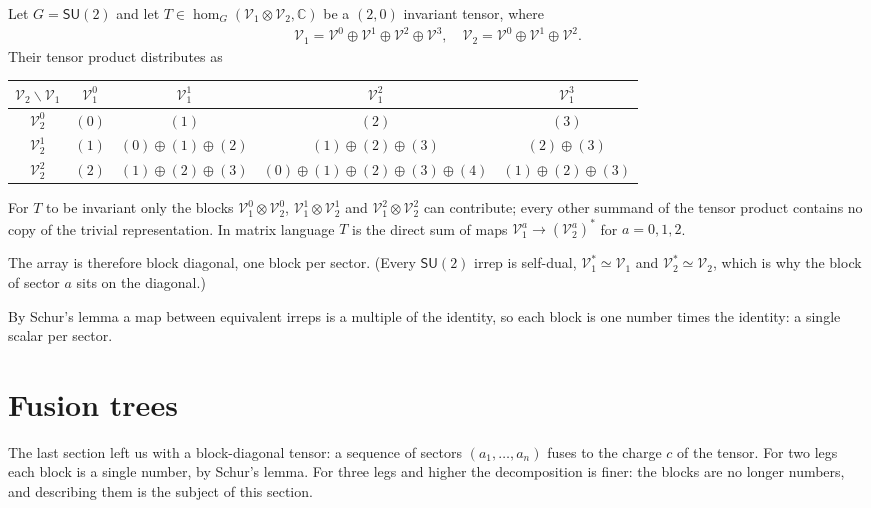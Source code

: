 \begin{example}
Let $G=\mathsf{SU}(2)$ and let $T\in\hom_G(\mathscr{V}_1\otimes\mathscr{V}_2,\mathbb{C})$ be a $(2,0)$ invariant tensor, where\begin{align}
    \mathscr{V}_1 = \mathscr{V}^{0}\oplus\mathscr{V}^{1}\oplus\mathscr{V}^{2}\oplus\mathscr{V}^{3},\quad \mathscr{V}_2 = \mathscr{V}^{0}\oplus\mathscr{V}^{1}\oplus\mathscr{V}^{2}.
\end{align}Their tensor product distributes as

\begin{table}[ht]
    \centering
    \begin{tabular}{c|cccc}
        $\mathscr{V}_2 \backslash \mathscr{V}_1$& $\mathscr{V}_1^{0}$ & $\mathscr{V}_1^{1}$ & $\mathscr{V}_1^{2}$ & $\mathscr{V}_1^{3}$ \\
        \hline
        $\mathscr{V}_2^{0}$ & $(0)$ & $(1)$ & $(2)$ & $(3)$ \\
        $\mathscr{V}_2^{1}$ & $(1)$ & $(0)\oplus(1)\oplus(2)$ & $(1)\oplus(2)\oplus(3)$ & $(2)\oplus(3)$ \\
        $\mathscr{V}_2^{2}$ & $(2)$ & $(1)\oplus(2)\oplus(3)$ & $(0)\oplus(1)\oplus(2)\oplus(3)\oplus(4)$ & $(1)\oplus(2)\oplus(3)$ 
    \end{tabular}
\end{table}
For $T$ to be invariant only the blocks $\mathscr{V}_1^{0}\otimes \mathscr{V}_2^{0}$, $\mathscr{V}_1^{1}\otimes \mathscr{V}_2^{1}$ and $\mathscr{V}_1^{2}\otimes \mathscr{V}_2^{2}$ can contribute; every other summand of the tensor product contains no copy of the trivial representation. In matrix language $T$ is the direct sum of maps $\mathscr{V}_1^{a}\to(\mathscr{V}_2^{a})^*$ for $a=0,1,2$.

The array is therefore block diagonal, one block per sector. (Every $\mathsf{SU}(2)$ irrep is self-dual, $\mathscr{V}_1^*\simeq\mathscr{V}_1$ and $\mathscr{V}_2^*\simeq\mathscr{V}_2$, which is why the block of sector $a$ sits on the diagonal.)


By Schur's lemma a map between equivalent irreps is a multiple of the identity, so each block is one number times the identity: a single scalar per sector.
\end{example}
\section{Fusion trees}
\label{sec:tree}
The last section left us with a block-diagonal tensor: a sequence of sectors $(a_1,\dots,a_n)$ fuses to the charge $c$ of the tensor. For two legs each block is a single number, by Schur's lemma. For three legs and higher the decomposition is finer: the blocks are no longer numbers, and describing them is the subject of this section.
